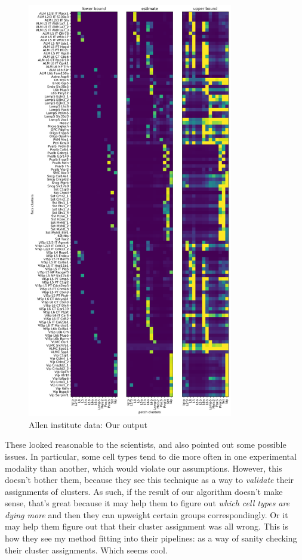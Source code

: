 \begin{figure}
\includegraphics[width=0.8\textwidth]{pics/allen}
\caption{Allen institute data: Our output \label{fig:allenoutput}}
\end{figure}

These looked reasonable to the scientists, and also pointed out some possible issues.  In particular, some cell types tend to die more often in one experimental modality than another, which would violate our assumptions.  However, this doesn't bother them, because they see this technique as a way to \emph{validate} their assignments of clusters.  As such, if the result of our algorithm doesn't make sense, that's great because it may help them to figure out \emph{which cell types are dying more} and then they can upweight certain groups correspondingly.  Or it may help them figure out that their cluster assignment was all wrong.  This is how they see my method fitting into their pipelines: as a way of sanity checking their cluster assignments.  Which seems cool.

